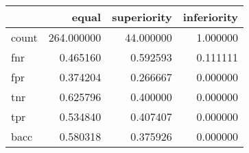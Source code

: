 \begin{tabular}{lrrr}
\toprule
{} &       equal &  superiority &  inferiority \\
\midrule
count &  264.000000 &    44.000000 &     1.000000 \\
fnr   &    0.465160 &     0.592593 &     0.111111 \\
fpr   &    0.374204 &     0.266667 &     0.000000 \\
tnr   &    0.625796 &     0.400000 &     0.000000 \\
tpr   &    0.534840 &     0.407407 &     0.000000 \\
bacc  &    0.580318 &     0.375926 &     0.000000 \\
\bottomrule
\end{tabular}
